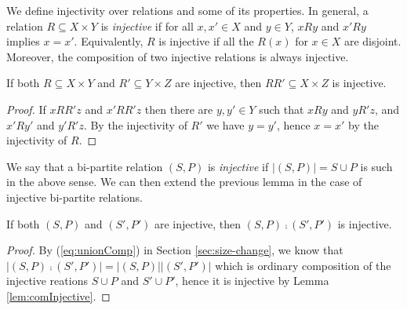 


We define injectivity over relations and some of its properties. In general, a relation $R \subseteq X \times Y$ is {\em injective} if for all $x,x' \in X$ and $y \in Y$, $xRy$ and $x'Ry$ implies $x = x'$. Equivalently, $R$ is injective if all the $R(x)$ for $x \in X$ are disjoint. Moreover, the composition of two injective relations is always injective.

\begin{lemma}\label{lem:comInjective}
If both $R \subseteq X \times Y$ and $R' \subseteq Y \times Z$ are injective, then $RR' \subseteq X \times Z$ is injective.
\end{lemma}

\begin{proof}
If $xRR'z$ and $x'RR'z$ then there are $y,y' \in Y$ such that $xRy$ and $yR'z$, and $x'Ry'$ and $y'R'z$. By the injectivity of $R'$ we have $y = y'$,
hence $x = x'$ by the injectivity of $R$.
\end{proof}

We say that a bi-partite relation $(S, P)$ is {\em injective} if $|(S, P)| = S \cup P$ is such in the above sense. We can then extend the previous lemma in the case of injective bi-partite relations.

\begin{lemma}\label{lem:biRelInjectiveComp}
If both $(S,P)$ and $(S',P')$ are injective, then $(S,P) \comp (S',P')$ is injective.
\end{lemma}

\begin{proof}
By (\ref{eq:unionComp}) in Section \ref{sec:size-change},  we know that $|(S,P) \comp (S',P')| =  |(S,P)| |(S',P')|$ which is ordinary composition of the injective reations $S \cup P$ and $S' \cup P'$, hence it is injective by Lemma \ref{lem:comInjective}.
\end{proof}

